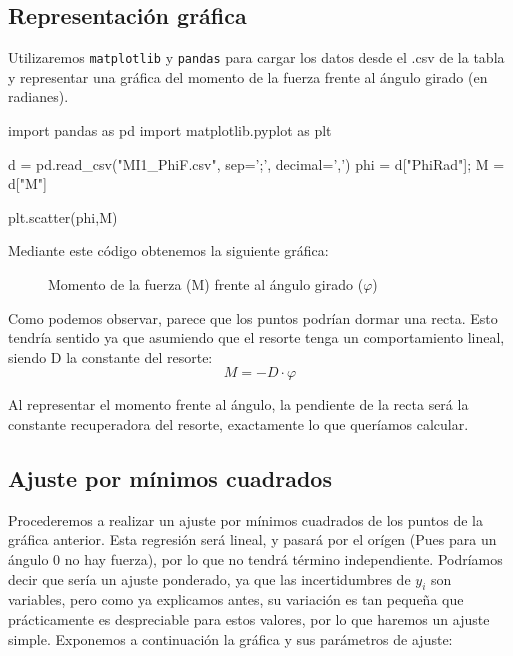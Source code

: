 \documentclass[12pt, a4paper, titlepage]{article}
\newcommand{\code}[1]{\texttt{#1}} %
\begin{document}
  \subsection{Representación gráfica}

  Utilizaremos \code{matplotlib} y \code{pandas} para cargar los datos desde el .csv de la tabla y representar una gráfica del momento de la fuerza frente al ángulo girado (en radianes).
  \begin{python}
    import pandas as pd
    import matplotlib.pyplot as plt

    d = pd.read_csv("MI1_PhiF.csv", sep=';', decimal=',')
    phi = d["PhiRad"]; M = d["M"]

    plt.scatter(phi,M)
  \end{python}

  Mediante este código obtenemos la siguiente gráfica:

  \begin{figure}[H]
    \hspace{3.2em} 
    \caption{Momento de la fuerza (M) frente al ángulo girado ($\varphi$)}
  \end{figure}

  Como podemos observar, parece que los puntos podrían dormar una recta. Esto tendría sentido ya que asumiendo que el resorte tenga un comportamiento lineal, siendo D la constante del resorte:
  \begin{equation}
    M = -D \cdot \varphi \label{ec:md}
  \end{equation}

  Al representar el momento frente al ángulo, la pendiente de la recta será la constante recuperadora del resorte, exactamente lo que queríamos calcular.

  \subsection{Ajuste por mínimos cuadrados}

  Procederemos a realizar un ajuste por mínimos cuadrados de los puntos de la gráfica anterior. Esta regresión será lineal, y pasará por el orígen (Pues para un ángulo 0 no hay fuerza), por lo que no tendrá término independiente. Podríamos decir que sería un ajuste ponderado, ya que las incertidumbres de $y_i$ son variables, pero como ya explicamos antes, su variación es tan pequeña que prácticamente es despreciable para estos valores, por lo que haremos un ajuste simple. Exponemos a continuación la gráfica y sus parámetros de ajuste:
\end{document}
